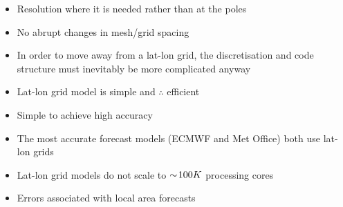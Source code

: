 \begin{slide}

\begin{itemize}
\item Resolution where it is needed rather than at the poles
\item No abrupt changes in mesh/grid spacing
\item In order to move away from a lat-lon grid, the discretisation and code structure must inevitably be more complicated anyway   
\end{itemize}



\begin{itemize}
\item Lat-lon grid model is simple and $\therefore$ efficient
\item Simple to achieve high accuracy
\item The most accurate forecast models (ECMWF and Met Office) both use lat-lon grids
\end{itemize}


\begin{itemize}
\item Lat-lon grid models do not scale to $\sim\negthinspace 100K$ processing cores
\item Errors associated with local area forecasts
\end{itemize}

\end{slide}

